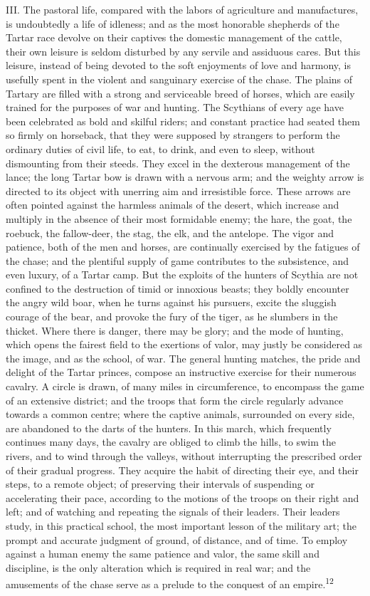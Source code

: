 III. The pastoral life, compared with the labors of agriculture
and manufactures, is undoubtedly a life of idleness; and as the
most honorable shepherds of the Tartar race devolve on their
captives the domestic management of the cattle, their own leisure
is seldom disturbed by any servile and assiduous cares. But this
leisure, instead of being devoted to the soft enjoyments of love
and harmony, is usefully spent in the violent and sanguinary
exercise of the chase. The plains of Tartary are filled with a
strong and serviceable breed of horses, which are easily trained
for the purposes of war and hunting. The Scythians of every age
have been celebrated as bold and skilful riders; and constant
practice had seated them so firmly on horseback, that they were
supposed by strangers to perform the ordinary duties of civil
life, to eat, to drink, and even to sleep, without dismounting
from their steeds. They excel in the dexterous management of the
lance; the long Tartar bow is drawn with a nervous arm; and the
weighty arrow is directed to its object with unerring aim and
irresistible force. These arrows are often pointed against the
harmless animals of the desert, which increase and multiply in
the absence of their most formidable enemy; the hare, the goat,
the roebuck, the fallow-deer, the stag, the elk, and the
antelope. The vigor and patience, both of the men and horses, are
continually exercised by the fatigues of the chase; and the
plentiful supply of game contributes to the subsistence, and even
luxury, of a Tartar camp. But the exploits of the hunters of
Scythia are not confined to the destruction of timid or innoxious
beasts; they boldly encounter the angry wild boar, when he turns
against his pursuers, excite the sluggish courage of the bear,
and provoke the fury of the tiger, as he slumbers in the thicket.
Where there is danger, there may be glory; and the mode of
hunting, which opens the fairest field to the exertions of valor,
may justly be considered as the image, and as the school, of war.
The general hunting matches, the pride and delight of the Tartar
princes, compose an instructive exercise for their numerous
cavalry. A circle is drawn, of many miles in circumference, to
encompass the game of an extensive district; and the troops that
form the circle regularly advance towards a common centre; where
the captive animals, surrounded on every side, are abandoned to
the darts of the hunters. In this march, which frequently
continues many days, the cavalry are obliged to climb the hills,
to swim the rivers, and to wind through the valleys, without
interrupting the prescribed order of their gradual progress. They
acquire the habit of directing their eye, and their steps, to a
remote object; of preserving their intervals of suspending or
accelerating their pace, according to the motions of the troops
on their right and left; and of watching and repeating the
signals of their leaders. Their leaders study, in this practical
school, the most important lesson of the military art; the prompt
and accurate judgment of ground, of distance, and of time. To
employ against a human enemy the same patience and valor, the
same skill and discipline, is the only alteration which is
required in real war; and the amusements of the chase serve as a
prelude to the conquest of an empire.\textsuperscript{12}


